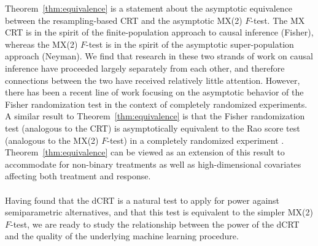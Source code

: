 \documentclass[12pt]{article}
\theoremstyle{definition}
\theoremstyle{remark}
\newcommand{\prx}{\bm X}
\newcommand{\prz}{\bm Z}
\newcommand{\pry}{{\bm Y}}
\begin{document}
Theorem~\ref{thm:equivalence} is a statement about the asymptotic equivalence between the resampling-based CRT and the asymptotic MX(2) $F$-test. The MX CRT is in the spirit of the finite-population approach to causal inference (Fisher), whereas the MX(2) $F$-test is in the spirit of the asymptotic super-population approach (Neyman). We find that research in these two strands of work on causal inference have proceeded largely separately from each other, and therefore connections between the two have received relatively little attention. However, there has been a recent line of work \cite{Ding2017,Wu2020a,Zhao2021} focusing on the asymptotic behavior of the Fisher randomization test in the context of completely randomized experiments. A similar result to Theorem~\ref{thm:equivalence} is that the Fisher randomization test (analogous to the CRT) is asymptotically equivalent to the Rao score test (analogous to the MX(2) $F$-test) in a completely randomized experiment \cite[Theorem A.1]{Ding2017}. Theorem~\ref{thm:equivalence} can be viewed as an extension of this result to accommodate for non-binary treatments as well as high-dimensional covariates affecting both treatment and response.






\paragraph{}

Having found that the dCRT is a natural test to apply for power against semiparametric alternatives, and that this test is equivalent to the simpler MX(2) $F$-test, we are ready to study the relationship between the power of the dCRT and the quality of the underlying machine learning procedure.

%	
\end{document}
